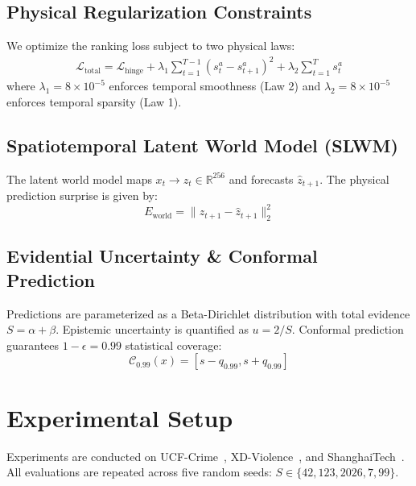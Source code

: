 \documentclass[10pt,journal,compsoc]{IEEEtran}
\begin{document}
\subsection{Physical Regularization Constraints}
We optimize the ranking loss subject to two physical laws:
\begin{align}
\mathcal{L}_{\text{total}} = \mathcal{L}_{\text{hinge}} + \lambda_1 \sum_{t=1}^{T-1} (s_t^a - s_{t+1}^a)^2 + \lambda_2 \sum_{t=1}^T s_t^a
\end{align}
where $\lambda_1 = 8 \times 10^{-5}$ enforces temporal smoothness (Law 2) and $\lambda_2 = 8 \times 10^{-5}$ enforces temporal sparsity (Law 1).

\subsection{Spatiotemporal Latent World Model (SLWM)}
The latent world model maps $x_t \to z_t \in \mathbb{R}^{256}$ and forecasts $\hat{z}_{t+1}$. The physical prediction surprise is given by:
\begin{equation}
E_{\text{world}} = \|z_{t+1} - \hat{z}_{t+1}\|_2^2
\end{equation}

\subsection{Evidential Uncertainty \& Conformal Prediction}
Predictions are parameterized as a Beta-Dirichlet distribution with total evidence $S = \alpha + \beta$. Epistemic uncertainty is quantified as $u = 2/S$. Conformal prediction guarantees $1 - \epsilon = 0.99$ statistical coverage:
\begin{equation}
\mathcal{C}_{0.99}(x) = [s - q_{0.99}, s + q_{0.99}]
\end{equation}

\section{Experimental Setup}
Experiments are conducted on UCF-Crime~\cite{sultani2018real}, XD-Violence~\cite{wu2020not}, and ShanghaiTech~\cite{luo2017revisit}. All evaluations are repeated across five random seeds: $S \in \{42, 123, 2026, 7, 99\}$.
\end{document}
